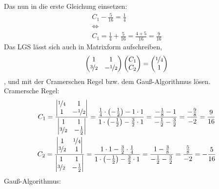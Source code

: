 \documentclass[11pt,a4paper,DIV=12]{scrartcl}
\begin{document}
Das nun in die erste Gleichung einsetzen:
\begin{gather}
	C_1-\frac{5}{16}=\frac{1}{4}\\
	\Longleftrightarrow\nonumber\\
	C_1=\frac{1}{4}+\frac{5}{16}=\frac{4+5}{16}=\frac{9}{16}
\end{gather}
Das LGS lässt sich auch in Matrixform aufschreiben,
\begin{gather}
	\begin{pmatrix}
		1 & 1 \\
		\nicefrac{3}{2} & -\nicefrac{1}{2}
	\end{pmatrix}
	\begin{pmatrix}
		C_1 \\
		C_2
	\end{pmatrix}
	=
	\begin{pmatrix}
		\nicefrac{1}{4} \\
		1
	\end{pmatrix}
\end{gather}
, und mit der Cramerschen Regel bzw. dem Gauß-Algorithmus lösen.\\
Cramersche Regel:
\begin{gather}
	C_1=\frac{\begin{vmatrix}
		\nicefrac{1}{4} & 1\\
		1 & -\nicefrac{1}{2}
	\end{vmatrix}}
	{\begin{vmatrix}
		1 & 1 \\
		\nicefrac{3}{2} & -\frac{1}{2}
	\end{vmatrix}}=\frac{\frac{1}{4}\cdot\left(-\frac{1}{2}\right)-1\cdot 1}{1\cdot\left(-\frac{1}{2}\right)-\frac{3}{2}\cdot1}=\frac{-\frac{1}{8}-1}{-\frac{1}{2}-\frac{3}{2}}=\frac{-\frac{9}{8}}{-2}=\frac{9}{16}\\
	C_2=\frac{\begin{vmatrix}
		1 & \nicefrac{1}{4}\\
		\nicefrac{3}{2} & 1
	\end{vmatrix}}
	{\begin{vmatrix}
		1 & 1 \\
		\nicefrac{3}{2} & -\frac{1}{2}
	\end{vmatrix}}=\frac{1\cdot 1-\frac{3}{2}\cdot\frac{1}{4}}{1\cdot\left(-\frac{1}{2}\right)-\frac{3}{2}\cdot1}=\frac{1-\frac{3}{8}}{-\frac{1}{2}-\frac{3}{2}}=\frac{\frac{5}{8}}{-2}=-\frac{5}{16}
\end{gather}
Gauß-Algorithmus:
\end{document}
